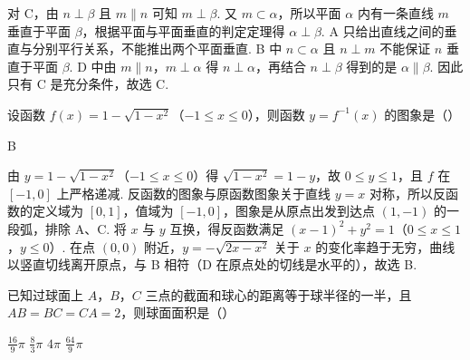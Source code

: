 \documentclass[UTF8,a4paper,oneside,11pt]{ctexbook}
\begin{document}
\begin{solution}
对 C，由 \(n \perp \beta\) 且 \(m \parallel n\) 可知 \(m \perp \beta\). 又 \(m \subset \alpha\)，所以平面 \(\alpha\) 内有一条直线 \(m\) 垂直于平面 \(\beta\)，根据平面与平面垂直的判定定理得 \(\alpha \perp \beta\).
A 只给出直线之间的垂直与分别平行关系，不能推出两个平面垂直. B 中 \(n \subset \alpha\) 且 \(n \perp m\) 不能保证 \(n\) 垂直于平面 \(\beta\). D 中由 \(m \parallel n\)，\(m \perp \alpha\) 得 \(n \perp \alpha\)，再结合 \(n \perp \beta\) 得到的是 \(\alpha \parallel \beta\). 因此只有 C 是充分条件，故选 C.
\end{solution}

\begin{problem}
设函数 \(f(x) = 1 - \sqrt{1 - x^2}\)（\(-1 \leqslant x \leqslant 0\)），则函数 \(y = f^{-1}(x)\) 的图象是（\quad）

\choices
{}
{}
{}
{}
\end{problem}

\begin{answer}
B
\end{answer}

\begin{solution}
由 \(y = 1 - \sqrt{1 - x^2}\)（\(-1 \leqslant x \leqslant 0\)）得 \(\sqrt{1 - x^2} = 1 - y\)，故 \(0 \leqslant y \leqslant 1\)，且 \(f\) 在 \([-1, 0]\) 上严格递减. 反函数的图象与原函数图象关于直线 \(y = x\) 对称，所以反函数的定义域为 \([0, 1]\)，值域为 \([-1, 0]\)，图象是从原点出发到达点 \((1, -1)\) 的一段弧，排除 A、C.
将 \(x\) 与 \(y\) 互换，得反函数满足 \((x - 1)^2 + y^2 = 1\)（\(0 \leqslant x \leqslant 1\)，\(y \leqslant 0\)）. 在点 \((0, 0)\) 附近，\(y = -\sqrt{2x - x^2}\) 关于 \(x\) 的变化率趋于无穷，曲线以竖直切线离开原点，与 B 相符（D 在原点处的切线是水平的），故选 B.
\end{solution}

\begin{problem}
已知过球面上 \(A\)，\(B\)，\(C\) 三点的截面和球心的距离等于球半径的一半，且 \(AB = BC = CA = 2\)，则球面面积是（\quad）

\choices
    {\(\frac{16}{9}\pi\)}
    {\(\frac{8}{3}\pi\)}
    {\(4\pi\)}
    {\(\frac{64}{9}\pi\)}
\end{problem}
\end{document}
